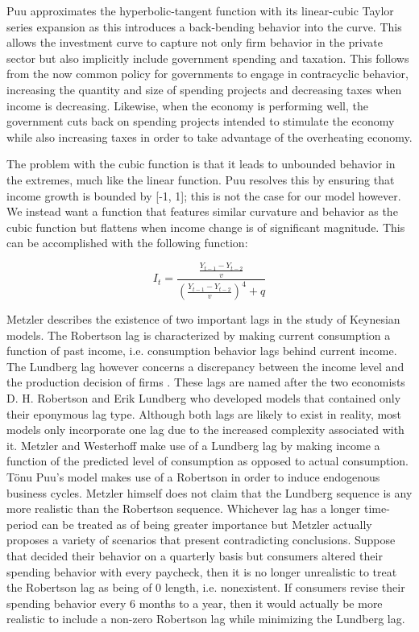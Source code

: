 Puu approximates the hyperbolic-tangent function with its linear-cubic Taylor series expansion as this introduces a back-bending behavior into the curve. This allows the investment curve to capture not only firm behavior in the private sector but also implicitly include government spending and taxation. This follows from the now common policy for governments to engage in contracyclic behavior, increasing the quantity and size of spending projects and decreasing taxes when income is decreasing. Likewise, when the economy is performing well, the government cuts back on spending projects intended to stimulate the economy while also increasing taxes in order to take advantage of the overheating economy. 

The problem with the cubic function is that it leads to unbounded behavior in the extremes, much like the linear function. Puu resolves this by ensuring that income growth is bounded by [-1, 1]; this is not the case for our model however. We instead want a function that features similar curvature and behavior as the cubic function but flattens when income change is of significant magnitude. This can be accomplished with the following function:

\begin{equation}
    I_t = \frac{\frac{Y_{t-1}-Y_{t-2}}{v}}{(\frac{Y_{t-1}-Y_{t-2}}{v})^4+q}	
\end{equation}

Metzler describes the existence of two important lags in the study of Keynesian models. The Robertson lag is characterized by making current consumption a function of past income, i.e. consumption behavior lags behind current income. The Lundberg lag however concerns a discrepancy between the income level and the production decision of firms \autocite{Metzler1941} . These lags are named after the two economists D. H. Robertson and Erik Lundberg who developed models that contained only their eponymous lag type. Although both lags are likely to exist in reality, most models only incorporate one lag due to the increased complexity associated with it. Metzler and Westerhoff make use of a Lundberg lag by making income a function of the predicted level of consumption as opposed to actual consumption. T\"{o}nu Puu's model makes use of a Robertson in order to induce endogenous business cycles. Metzler himself does not claim that the Lundberg sequence is any more realistic than the Robertson sequence. Whichever lag has a longer time-period can be treated as of being greater importance but Metzler actually proposes a variety of scenarios that present contradicting conclusions. Suppose that decided their behavior on a quarterly basis but consumers altered their spending behavior with every paycheck, then it is no longer unrealistic to treat the Robertson lag as being of 0 length, i.e. nonexistent. If consumers revise their spending behavior every 6 months to a year, then it would actually be more realistic to include a non-zero Robertson lag while minimizing the Lundberg lag. 

